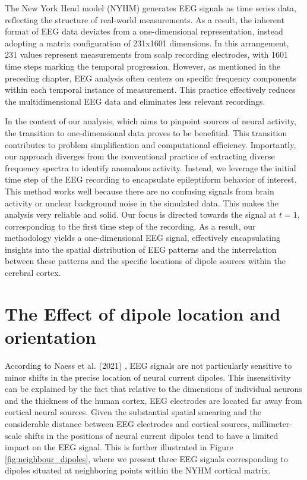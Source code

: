\documentclass[a4paper, UKenglish, 11pt]{uiomaster}
\begin{document}
The New York Head model (NYHM) generates EEG signals as time series data, reflecting the structure of real-world measurements. As a result, the inherent format of EEG data deviates from a one-dimensional representation, instead adopting a matrix configuration of 231x1601 dimensions. In this arrangement, 231 values represent measurements from scalp recording electrodes, with 1601 time steps marking the temporal progression. However, as mentioned in the preceding chapter, EEG analysis often centers on specific frequency components within each temporal instance of measurement. This practice effectively reduces the multidimensional EEG data and eliminates less relevant recordings.

In the context of our analysis, which aims to pinpoint sources of neural activity, the transition to one-dimensional data proves to be benefitial. This transition contributes to problem simplification and computational efficiency. Importantly, our approach diverges from the conventional practice of extracting diverse frequency spectra to identify anomalous activity. Instead, we leverage the initial time step of the EEG recording to encapsulate epileptiform behavior of interest. This method works well because there are no confusing signals from brain activity or unclear background noise in the simulated data. This makes the analysis very reliable and solid. Our focus is directed towards the signal at $t = 1$, corresponding to the first time step of the recording. As a result, our methodology yields a one-dimensional EEG signal, effectively encapsulating insights into the spatial distribution of EEG patterns and the interrelation between these patterns and the specific locations of dipole sources within the cerebral cortex.




\section{The Effect of dipole location and orientation}
According to Naess et al. (2021) \cite{naess2021biophysically}, EEG signals are not particularly sensitive to minor shifts in the precise location of neural current dipoles. This insensitivity can be explained by the fact that relative to the dimensions of individual neurons and the thickness of the human cortex, EEG electrodes are located far away from cortical neural sources. Given the substantial spatial smearing and the considerable distance between EEG electrodes and cortical sources, millimeter-scale shifts in the positions of neural current dipoles tend to have a limited impact on the EEG signal. This is further illustrated in Figure \ref{fig:neighbour_dipoles}, where we present three EEG signals corresponding to dipoles situated at neighboring points within the NYHM cortical matrix.
\end{document}
